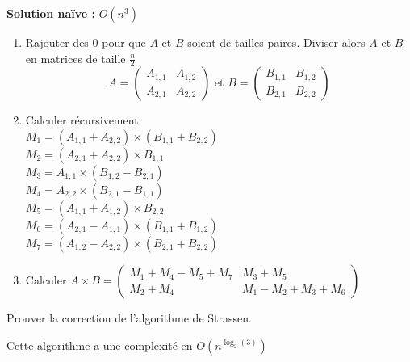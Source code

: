 \textbf{Solution naïve :} $O(n^3)$
\begin{algo}
	\begin{enumerate}
		\item Rajouter des 0 pour que $A$ et $B$ soient de tailles paires. Diviser alors $A$ et $B$ en matrices de taille $\frac{n}{2}$
		$$A = \left( \begin{array}{c|c}
			A_{1, 1} & A_{1, 2} \\ \hline
			A_{2, 1} & A_{2, 2}
		\end{array}\right) \text{ et } B = \left( \begin{array}{c|c}
		B_{1, 1} & B_{1, 2} \\ \hline
		B_{2, 1} & B_{2, 2}
		\end{array}\right)$$
		
		\item Calculer récursivement \\
		$M_1 = (A_{1, 1} + A_{2, 2}) \times (B_{1, 1} + B_{2, 2}) $\\
		$M_2 = (A_{2, 1} + A_{2,2}) \times B_{1, 1} $\\
		$M_3 = A_{1, 1} \times (B_{1, 2} - B_{2, 1})$\\
		$M_4 = A_{2, 2} \times (B_{2, 1} - B_{1, 1})$\\
		$M_5 = (A_{1, 1} + A_{1, 2}) \times B_{2, 2}$\\
		$M_6 = (A_{2, 1} - A_{1, 1}) \times (B_{1, 1} + B_{1, 2})$\\
		$M_7 = (A_{1, 2} - A_{2, 2}) \times (B_{2, 1} + B_{2, 2})$\\
		
		\item Calculer $A\times B = \left( \begin{array}{c|c}
			M_1 + M_4 - M_5 + M_7 & M_3 + M_5 \\ \hline
			M_2 + M_4 & M_1 - M_2 + M_3 + M_6
		\end{array}\right)$
		
	\end{enumerate}
\end{algo}

\begin{exercise}
	Prouver la correction de l'algorithme de Strassen.
\end{exercise}

\begin{proposition}
	Cette algorithme a une complexité en $O\left( n ^{\log_2(3)}\right)$
\end{proposition}

